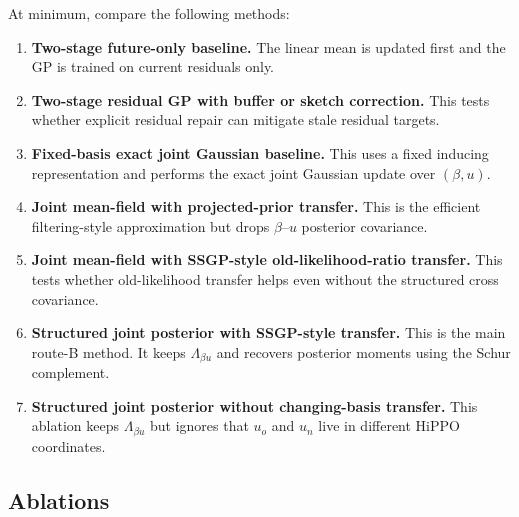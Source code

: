 \documentclass[12pt]{article}
\begin{document}
At minimum, compare the following methods:
\begin{enumerate}[label=(\arabic*)]
    \item \textbf{Two-stage future-only baseline.}
    The linear mean is updated first and the GP is trained on current residuals only.

    \item \textbf{Two-stage residual GP with buffer or sketch correction.}
    This tests whether explicit residual repair can mitigate stale residual targets.

    \item \textbf{Fixed-basis exact joint Gaussian baseline.}
    This uses a fixed inducing representation and performs the exact joint Gaussian
    update over $(\beta,u)$.

    \item \textbf{Joint mean-field with projected-prior transfer.}
    This is the efficient filtering-style approximation but drops $\beta$--$u$ posterior
    covariance.

    \item \textbf{Joint mean-field with SSGP-style old-likelihood-ratio transfer.}
    This tests whether old-likelihood transfer helps even without the structured cross
    covariance.

    \item \textbf{Structured joint posterior with SSGP-style transfer.}
    This is the main route-B method. It keeps $\Lambda_{\beta u}$ and recovers posterior
    moments using the Schur complement.

    \item \textbf{Structured joint posterior without changing-basis transfer.}
    This ablation keeps $\Lambda_{\beta u}$ but ignores that $u_o$ and $u_n$ live in
    different HiPPO coordinates.
\end{enumerate}

\subsection{Ablations}
\end{document}

